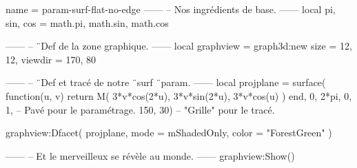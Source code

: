 \documentclass{standalone}
\begin{document}
\begin{luadraw}{name = param-surf-flat-no-edge}
------
-- Nos ingrédients de base.
------
local pi, sin, cos = math.pi, math.sin, math.cos

------
-- ¨Def de la zone graphique.
------
local graphview = graph3d:new{
  size    = {12, 12},
  viewdir = {170, 80}
}

------
-- ¨Def et tracé de notre ¨surf ¨param.
------
local projplane = surface(
  function(u, v)
    return M(
      3*v*cos(2*u),
      3*v*sin(2*u),
      3*v*cos(u)
    )
  end,
  0, 2*pi, 0, 1,  -- Pavé pour le paramétrage.
  {150, 30})      -- "Grille" pour le tracé.

graphview:Dfacet(
  projplane,
  {
    mode  = mShadedOnly,
    color = "ForestGreen"
  })

------
-- Et le merveilleux se révèle au monde.
------
graphview:Show()
\end{luadraw}
\end{document}
